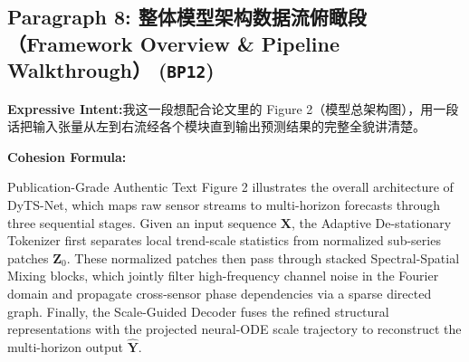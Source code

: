 \subsection*{Paragraph 8: 整体模型架构数据流俯瞰段（Framework Overview \& Pipeline Walkthrough） (\texttt{BP12})}
\noindent\textbf{Expressive Intent:}\enspace 我这一段想配合论文里的 Figure 2（模型总架构图），用一段话把输入张量从左到右流经各个模块直到输出预测结果的完整全貌讲清楚。\par
\noindent\textbf{Cohesion Formula:}\par\vspace{4pt}
\begin{ExampleBox}{Publication-Grade Authentic Text}
Figure 2 illustrates the overall architecture of DyTS-Net, which maps raw sensor streams to multi-horizon forecasts through three sequential stages. Given an input sequence $\mathbf{X}$, the Adaptive De-stationary Tokenizer first separates local trend-scale statistics from normalized sub-series patches $\mathbf{Z}_0$. These normalized patches then pass through stacked Spectral-Spatial Mixing blocks, which jointly filter high-frequency channel noise in the Fourier domain and propagate cross-sensor phase dependencies via a sparse directed graph. Finally, the Scale-Guided Decoder fuses the refined structural representations with the projected neural-ODE scale trajectory to reconstruct the multi-horizon output $\hat{\mathbf{Y}}$.
\end{ExampleBox}
